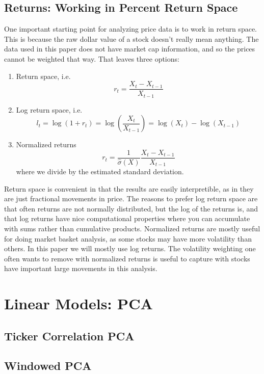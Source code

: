 \documentclass{article}
\begin{document}
\subsection{Returns: Working in Percent Return Space}

One important starting point for analyzing price data is to work in return space.
This is because the raw dollar value of a stock doesn't really mean anything. The
data used in this paper does not have market cap information, and so the prices
cannot be weighted that way. That leaves three options:

\begin{enumerate}
    \item
        Return space, i.e.
        \[ r_t = \frac{X_t - X_{t-1}}{X_{t-1}} \]
    \item
        Log return space, i.e.
        \[ l_t = \log\left( 1+ r_t \right) = \log\left( \frac{X_t}{X_{t-1}} \right) = \log(X_t) - \log(X_{t-1}) \] 
    \item
        Normalized returns
        \[ r_{t} = \frac{1}{\hat{\sigma}(X)} \frac{X_t - X_{t-1}}{X_{t-1}} \]
        where we divide by the estimated standard deviation.
\end{enumerate}

Return space is convenient in that the results are easily interpretible, as in they are
just fractional movements in price. The reasons to prefer log return space are that
often returns are not normally distributed, but the log of the returns is, and that
log returns have nice computational properties where you can accumulate with sums
rather than cumulative products. Normalized returns are mostly useful for doing
market basket analysis, as some stocks may have more volatility than others. In this
paper we will mostly use log returns. The volatility weighting one often wants to
remove with normalized returns is useful to capture with stocks have important
large movements in this analysis.

\section{Linear Models: PCA}

\subsection{Ticker Correlation PCA}

\subsection{Windowed PCA}
\end{document}
